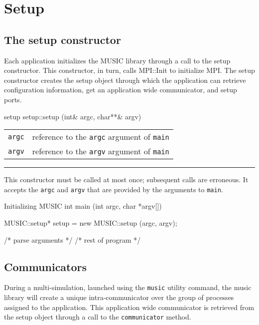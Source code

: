\documentclass[a4paper]{report}
\makeatletter
\newenvironment{parameters}%
{\begin{tabular}{@{\hspace{2em}}lp{0.6\textwidth}}}%
{\end{tabular}\par\vspace{1mm}\par\hrule\par\vspace{5mm}}
\makeatother
\begin{document}
\section{Setup}

\subsection{The setup constructor}

Each application initializes the MUSIC library through a call to the
setup constructor.  This constructor, in turn, calls
MPI::Init to initialize
MPI.  The setup constructor creates the setup
object through which the application can retrieve configuration
information, get an application wide communicator, and setup ports.

\begin{head}{setup}
  setup::setup (int& argc, char**& argv)
\end{head}
\begin{parameters}
  \lstinline|argc| &%
  reference to the \lstinline|argc| argument of \lstinline|main| \\
  \lstinline|argv| &%
  reference to the \lstinline|argv| argument of \lstinline|main| \\
\end{parameters}

This constructor must be called at most once; subsequent calls are
erroneous.  It accepts the \lstinline|argc| and \lstinline|argv| that are
provided by the arguments to \lstinline|main|.

\pagebreak
\begin{code}{Initializing MUSIC}
int main (int argc, char *argv[])
{
  MUSIC::setup* setup = new MUSIC::setup (argc, argv);

  /* parse arguments */
  /* rest of program */
}
\end{code}

\subsection{Communicators}

During a multi-simulation, launched using the \lstinline|music|
utility command, the music library will create a unique
intra-communicator over the group of processes assigned to the
application.  This application wide communicator is retrieved from the
setup object through a call to the
\lstinline|communicator| method.
\end{document}
